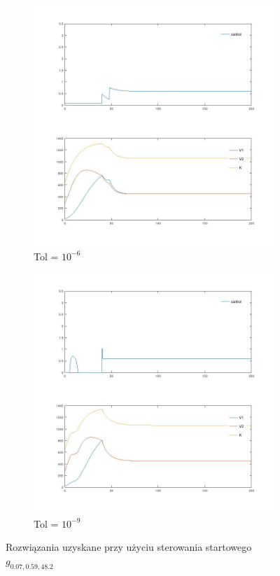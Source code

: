 \documentclass[licencjacka]{pracamgr}
\begin{document}
\begin{figure}[h]
  \begin{subfigure}{.5\textwidth}
    \includegraphics[width=\textwidth]{../plots/p_comp_6}
    \caption{Tol = $10^{-6}$}\label{p_comp_6}
  \end{subfigure}
  \begin{subfigure}{.5\textwidth}
    \includegraphics[width=\textwidth]{../plots/p_comp_9}
    \caption{Tol = $10^{-9}$}\label{p_comp_9}
  \end{subfigure}%
  \caption{Rozwiązania uzyskane przy użyciu sterowania startowego $g_{0.07,0.59,48.2}$}\label{test_gcomp_sol}
\end{figure}
\end{document}
